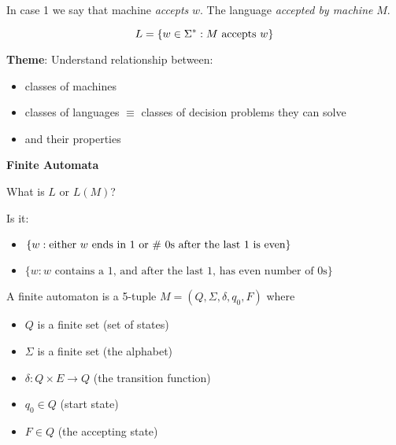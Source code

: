 In case 1 we say that machine \emph{accepts} $w$. The language \emph{accepted by machine} $M$.

\begin{equation*}
    L = \left \{ w \in \Sigma^*: M \text{ accepts } w \right \}
\end{equation*}

\textbf{Theme}: Understand relationship between:

\begin{itemize}
    \item classes of machines
    \item classes of languages $\equiv$ classes of decision problems they can solve
    \item and their properties
\end{itemize}

\textbf{Finite Automata}

What is $L$ or $L(M)$?

Is it:

\begin{itemize}
    \item $\left \{ w: \text{either $w$ ends in 1 or \# 0s after the last 1 is even} \right \}$
    \item $\{w: \text{$w$ contains a 1, and after the last 1, has even number of 0s}\}$
\end{itemize}

\begin{definition}
    A finite automaton is a 5-tuple $M=(Q, \Sigma, \delta, q_0, F)$ where

    \begin{itemize}
        \item $Q$ is a finite set (set of states)
        \item $\Sigma$ is a finite set (the alphabet)
        \item $\delta: Q \times E \rightarrow Q$ (the transition function)
        \item $q_0 \in Q$ (start state)
        \item $F \in Q$ (the accepting state)
    \end{itemize}
\end{definition}


